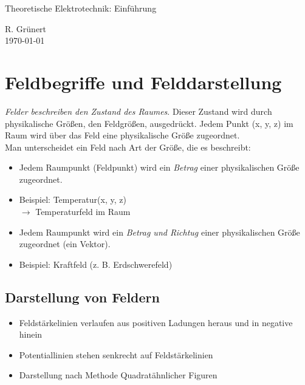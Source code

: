 \documentclass[11pt, a4paper]{article}
\begin{document}
\begin{center}
  \Large{Theoretische Elektrotechnik: Einführung}
\end{center}

\begin{flushright}
  R. Grünert\\
  \today
\end{flushright}

\tableofcontents
\pagebreak

\section{Feldbegriffe und Felddarstellung}
\emph{Felder beschreiben den Zustand des Raumes}. Dieser Zustand wird durch physikalische Größen, den Feldgrößen, ausgedrückt. Jedem Punkt (x, y, z) im Raum wird über das Feld eine physikalische Größe zugeordnet.\\

Man unterscheidet ein Feld nach Art der Größe, die es beschreibt:\\

\begin{itemize}
\item Jedem Raumpunkt (Feldpunkt) wird ein \emph{Betrag} einer physikalischen Größe zugeordnet.
\item Beispiel: Temperatur(x, y, z) \\$\rightarrow$ Temperaturfeld im Raum
\end{itemize}

\begin{itemize}
\item Jedem Raumpunkt wird ein \emph{Betrag und Richtug} einer physikalischen Größe zugeordnet (ein Vektor).
\item Beispiel: Kraftfeld (z. B. Erdschwerefeld)
\end{itemize}


\subsection{Darstellung von Feldern}

\begin{itemize}
  \item Feldstärkelinien verlaufen aus positiven Ladungen heraus und in negative hinein
  \item Potentiallinien stehen senkrecht auf Feldstärkelinien
  \item Darstellung nach \glqq Methode Quadratähnlicher Figuren\grqq
\end{itemize}
\end{document}

